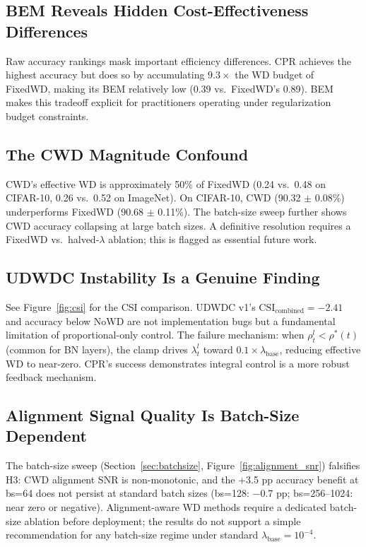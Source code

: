 \documentclass{article}
\begin{document}
\subsection{BEM Reveals Hidden Cost-Effectiveness Differences}

Raw accuracy rankings mask important efficiency differences. CPR achieves the highest accuracy but does so by accumulating $9.3\times$ the WD budget of FixedWD, making its BEM relatively low (0.39 vs.~FixedWD's 0.89). BEM makes this tradeoff explicit for practitioners operating under regularization budget constraints.

\subsection{The CWD Magnitude Confound}

CWD's effective WD is approximately 50\% of FixedWD (0.24 vs.~0.48 on CIFAR-10, 0.26 vs.~0.52 on ImageNet). On CIFAR-10, CWD (90.32 $\pm$ 0.08\%) underperforms FixedWD (90.68 $\pm$ 0.11\%). The batch-size sweep further shows CWD accuracy collapsing at large batch sizes. A definitive resolution requires a FixedWD vs.~halved-$\lambda$ ablation; this is flagged as essential future work.

\subsection{UDWDC Instability Is a Genuine Finding}

See Figure~\ref{fig:csi} for the CSI comparison. UDWDC v1's $\text{CSI}_{\text{combined}} = -2.41$ and accuracy below NoWD are not implementation bugs but a fundamental limitation of proportional-only control. The failure mechanism: when $\rho_t^l < \rho^*(t)$ (common for BN layers), the clamp drives $\lambda_t^l$ toward $0.1 \times \lambda_{\text{base}}$, reducing effective WD to near-zero. CPR's success demonstrates integral control is a more robust feedback mechanism.

\subsection{Alignment Signal Quality Is Batch-Size Dependent}

The batch-size sweep (Section~\ref{sec:batchsize}, Figure~\ref{fig:alignment_snr}) falsifies H3: CWD alignment SNR is non-monotonic, and the $+$3.5 pp accuracy benefit at bs=64 does not persist at standard batch sizes (bs=128: $-$0.7 pp; bs=256--1024: near zero or negative). Alignment-aware WD methods require a dedicated batch-size ablation before deployment; the results do not support a simple recommendation for any batch-size regime under standard $\lambda_{\text{base}} = 10^{-4}$.
\end{document}

